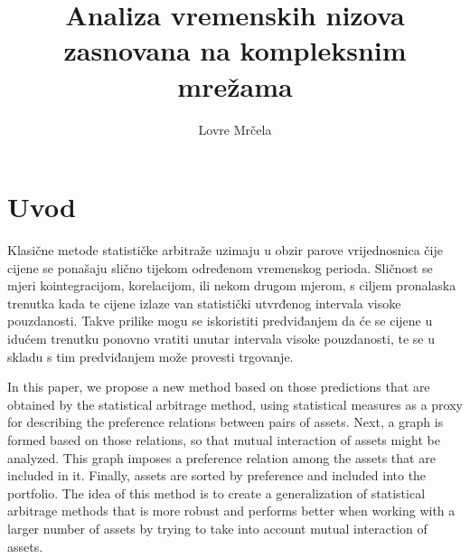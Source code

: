 \documentclass[lmodern, utf8, diplomski, numeric]{fer}
\begin{document}

\title{Analiza vremenskih nizova zasnovana na kompleksnim mrežama}

\author{Lovre Mrčela}

\maketitle


\zahvala{}

\tableofcontents

\chapter{Uvod}
  Klasične metode statističke arbitraže uzimaju u obzir parove vrijednosnica čije cijene se ponašaju slično tijekom određenom vremenskog perioda.
  Sličnost se mjeri kointegracijom, korelacijom, ili nekom drugom mjerom, s ciljem pronalaska trenutka kada te cijene izlaze van statistički utvrđenog intervala visoke pouzdanosti.
  Takve prilike mogu se iskoristiti predviđanjem da će se cijene u idućem trenutku ponovno vratiti unutar intervala visoke pouzdanosti, te se u skladu s tim predviđanjem može provesti trgovanje.
  
  In this paper, we propose a new method based on those predictions that are obtained by the statistical arbitrage method, using statistical measures as a proxy for describing the preference relations between pairs of assets.
  Next, a graph is formed based on those relations, so that mutual interaction of assets might be analyzed.
  This graph imposes a preference relation among the assets that are included in it.
  Finally, assets are sorted by preference and included into the portfolio.
  The idea of this method is to create a generalization of statistical arbitrage methods that is more robust and performs better when working with a larger number of assets by trying to take into account mutual interaction of assets.
\end{document}
